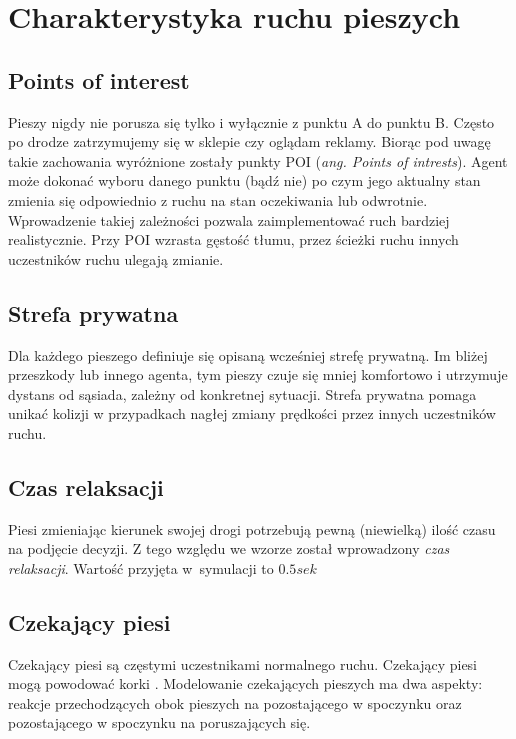 \chapter{Charakterystyka ruchu pieszych}
\label{cha:charakterystykaRuchu}

\section{Points of interest}
\label{sec:pointsOfInterest}

Pieszy nigdy nie porusza się tylko i wyłącznie z punktu A do punktu B. Często po drodze zatrzymujemy się w sklepie czy oglądam reklamy. Biorąc pod uwagę takie zachowania wyróżnione zostały punkty POI (\textit{ang. Points of intrests}). Agent może dokonać wyboru danego punktu (bądź nie) po czym jego aktualny stan zmienia się odpowiednio z ruchu na stan oczekiwania lub odwrotnie. Wprowadzenie takiej zależności pozwala zaimplementować ruch bardziej realistycznie. Przy POI wzrasta gęstość tłumu, przez ścieżki ruchu innych uczestników ruchu ulegają zmianie.
 
\section{Strefa prywatna}
\label{sec:strefaPryw}

Dla każdego pieszego definiuje się opisaną wcześniej strefę prywatną. Im bliżej przeszkody lub innego agenta, tym pieszy czuje się mniej komfortowo i utrzymuje dystans od sąsiada, zależny od konkretnej sytuacji. Strefa prywatna pomaga unikać kolizji w przypadkach nagłej zmiany prędkości przez innych uczestników ruchu.

\section{Czas relaksacji}
\label{sec:czasRelaksacji}

Piesi zmieniając kierunek swojej drogi potrzebują pewną (niewielką) ilość czasu na podjęcie decyzji. Z tego względu we wzorze został wprowadzony \textit{czas relaksacji}. Wartość przyjęta w~symulacji to $0.5 sek$

\section{Czekający piesi}
\label{sec:czekajacyPiesi}

Czekający piesi są częstymi uczestnikami normalnego ruchu. Czekający piesi mogą powodować korki \cite{6}. Modelowanie czekających pieszych ma dwa aspekty: reakcje  przechodzących obok pieszych na pozostającego w spoczynku oraz pozostającego w spoczynku na poruszających się.

